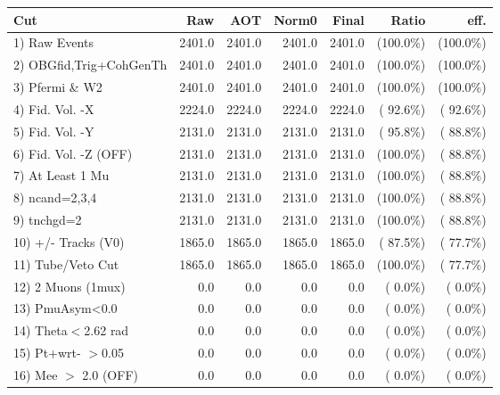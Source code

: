  \begin{table}[h!]\centering
 \begin{tabular}{||l||r|r|r|r|r|r||}
 \hline
 \hline
 Cut & Raw & AOT & Norm0 & Final & Ratio & eff.       \\
 \hline
  1) Raw Events           &       2401.0 &       2401.0 &       2401.0 &       2401.0 & (100.0\%) & (100.0\%) \\
  2) OBGfid,Trig+CohGenTh &       2401.0 &       2401.0 &       2401.0 &       2401.0 & (100.0\%) & (100.0\%) \\
  3) Pfermi \& W2         &       2401.0 &       2401.0 &       2401.0 &       2401.0 & (100.0\%) & (100.0\%) \\
  4) Fid. Vol. -X         &       2224.0 &       2224.0 &       2224.0 &       2224.0 & ( 92.6\%) & ( 92.6\%) \\
  5) Fid. Vol. -Y         &       2131.0 &       2131.0 &       2131.0 &       2131.0 & ( 95.8\%) & ( 88.8\%) \\
  6) Fid. Vol. -Z (OFF)   &       2131.0 &       2131.0 &       2131.0 &       2131.0 & (100.0\%) & ( 88.8\%) \\
  7) At Least 1 Mu        &       2131.0 &       2131.0 &       2131.0 &       2131.0 & (100.0\%) & ( 88.8\%) \\
  8) ncand=2,3,4          &       2131.0 &       2131.0 &       2131.0 &       2131.0 & (100.0\%) & ( 88.8\%) \\
  9) tnchgd=2             &       2131.0 &       2131.0 &       2131.0 &       2131.0 & (100.0\%) & ( 88.8\%) \\
 10) +/- Tracks (V0)      &       1865.0 &       1865.0 &       1865.0 &       1865.0 & ( 87.5\%) & ( 77.7\%) \\
 11) Tube/Veto Cut        &       1865.0 &       1865.0 &       1865.0 &       1865.0 & (100.0\%) & ( 77.7\%) \\
 12) 2 Muons (1mux)       &          0.0 &          0.0 &          0.0 &          0.0 & (  0.0\%) & (  0.0\%) \\
 13) PmuAsym<0.0          &          0.0 &          0.0 &          0.0 &          0.0 & (  0.0\%) & (  0.0\%) \\
 14) Theta$<$2.62 rad     &          0.0 &          0.0 &          0.0 &          0.0 & (  0.0\%) & (  0.0\%) \\
 15) Pt+wrt- $>$0.05      &          0.0 &          0.0 &          0.0 &          0.0 & (  0.0\%) & (  0.0\%) \\
 16) Mee $>$ 2.0  (OFF)   &          0.0 &          0.0 &          0.0 &          0.0 & (  0.0\%) & (  0.0\%) \\

\end{tabular}
\end{table}
